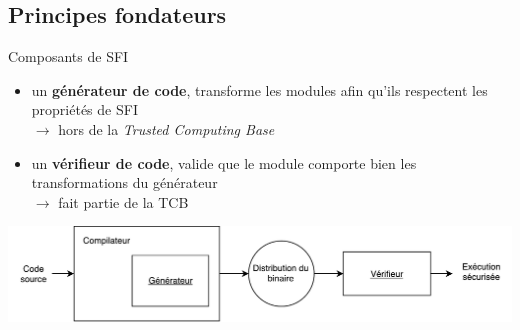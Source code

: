 \documentclass[10pt,usenames,dvipsnames]{beamer}
\begin{document}
\subsection{Principes fondateurs \cite{Wahbe:1993:ESF:173668.168635}}
\begin{frame}{Composants de SFI}
	\begin{itemize}
		\item un \textbf{générateur de code}, transforme les modules afin qu'ils respectent les propriétés de SFI\\
		$\rightarrow$ hors de la \textit{Trusted Computing Base}
		\item un \textbf{vérifieur de code}, valide que le module comporte bien les transformations du générateur\\
		$\rightarrow$ fait partie de la TCB
	\end{itemize}
	\vspace{5mm}
	\includegraphics[width=\textwidth]{sfi_schema.pdf}
\end{frame}

\end{document}
